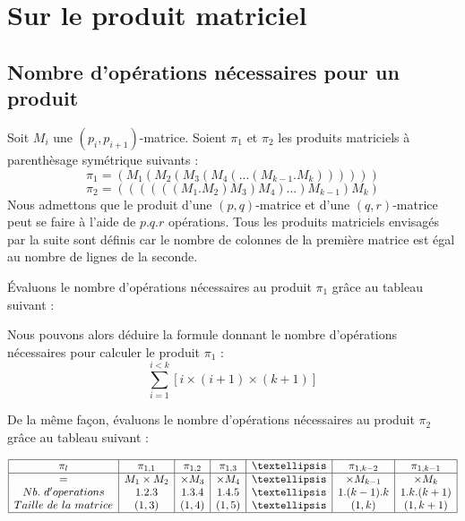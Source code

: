 
\section{Sur le produit matriciel}

\subsection{Nombre d'opérations nécessaires pour un produit}
Soit $M_i$ une $(p_i,p_{i+1})$-matrice. Soient $\pi _1$ et $\pi _2$ les produits matriciels à parenthèsage symétrique suivants : 
$$\pi _1 = (M_1(M_2(M_3(M_4(...(M_{k-1}.M_k))))))$$
$$\pi _2 = ((((((M_1.M_2)M_3)M_4)...)M_{k-1})M_k)$$
Nous admettons que le produit d'une $(p,q)$-matrice et d'une $(q,r)$-matrice peut se faire à l'aide de $p.q.r$ opérations. Tous les produits matriciels envisagés par la suite sont définis car le nombre de colonnes de la première matrice est égal au nombre de lignes de la seconde.

Évaluons le nombre d'opérations nécessaires au produit $\pi _1$ grâce au tableau suivant :
\begin{center}
 \end{center}
 
 Nous pouvons alors déduire la formule donnant le nombre d'opérations nécessaires pour calculer le produit $\pi _1$ :
$$ \sum\limits_{i =1}^{i < k} {[i\times (i+1) \times (k+1)]} $$

De la même façon, évaluons le nombre d'opérations nécessaires au produit $\pi _2$ grâce au tableau suivant :
\begin{center}
$ \begin{array}{|c|c|c|c|c|c|c|} \hline
	\pi _l & \pi _{1,1} & \pi _{1,2} & \pi _{1,3} & … & \pi _{1,k-2} & \pi _{1,k-1} \\ \hline
	=  & M_1 \times M_2 & \times M_3 & \times M_{4}  & … & \times M_{k-1} & \times M_k \\
	Nb.\ d'operations & 1.2.3 & 1.3.4 & 1.4.5 & … & 1.(k-1).k & 1.k.(k+1) \\
	Taille\ de\ la\ matrice & (1,3) & (1,4) & (1,5) & … & (1,k) & (1,k+1) \\ \hline
 \end{array} $
 \end{center}
 

